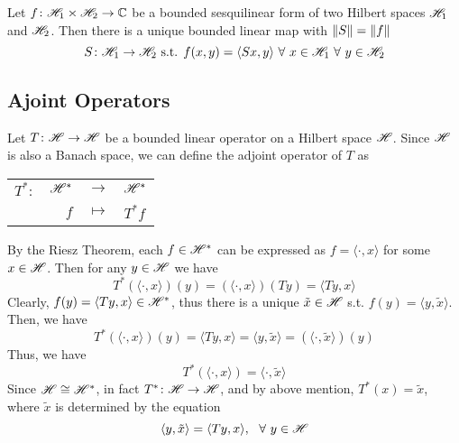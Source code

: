 \documentclass[a4paper,11pt]{report}
\begin{document}
\begin{thm}
	Let $f \colon \mathscr{H}_1 \times \mathscr{H}_2 \rightarrow \mathbb{C}$ be a bounded sesquilinear form of two Hilbert spaces $\mathscr{H}_1$ and $\mathscr{H}_2$. Then there is a unique bounded linear map with $\left\lVert S\right\lVert = \left\lVert f\right\lVert$
	\begin{equation*}
		S \colon \mathscr{H}_1 \rightarrow \mathscr{H}_2 \text{ s.t. } f(x,y)= \langle Sx,y \rangle ~\forall~ x \in \mathscr{H}_1 ~\forall~ y \in \mathscr{H}_2
	\end{equation*}
\end{thm}

\subsection{Ajoint Operators}

Let $T \colon \mathscr{H} \rightarrow \mathscr{H}$ be a bounded linear operator on a Hilbert space $\mathscr{H}$. Since $\mathscr{H}$ is also a Banach space, we can define the adjoint operator of $T$ as 
\begin{center}
	\begin{tabular}{l r c l}
		$T^{*} \colon$ & $\mathscr{H}^{*}$ & $\longrightarrow$ & $\mathscr{H}^{*}$ \\			~ & $f$ & $\longmapsto$ & $T^{*}f$
	\end{tabular}
\end{center}
By the Riesz Theorem, each $f \in \mathscr{H}^{*}$ can be expressed as $f = \langle \cdot, x \rangle$ for some $x \in \mathscr{H}$. Then for any $y \in \mathscr{H}$ we have
\begin{equation*}
	T^{*}(\langle \cdot, x \rangle)(y) = (\langle \cdot, x \rangle)(Ty) =\langle Ty, x \rangle 
\end{equation*}
Clearly, $f(y) = \langle Ty, x \rangle  \in \mathscr{H}^{*}$, thus there is a unique $\tilde{x} \in \mathscr{H}$ s.t. $f(y) = \langle y, \tilde{x} \rangle$. Then, we have 
\begin{equation*}
	T^{*}(\langle \cdot, x \rangle)(y) = \langle Ty, x \rangle = \langle y, \tilde{x} \rangle = (\langle \cdot, \tilde{x} \rangle)(y)
\end{equation*}
Thus, we have 
\begin{equation*}
	T^{*}(\langle \cdot, x \rangle) = \langle \cdot, \tilde{x} \rangle
\end{equation*}
Since $\mathscr{H} \cong \mathscr{H}^{*}$, in fact $T^{*} \colon \mathscr{H} \rightarrow \mathscr{H}$, and by above mention, $T^{*}(x) = \tilde{x}$, where $\tilde{x}$ is determined by the equation
\begin{equation*}
	\langle y, \tilde{x} \rangle = \langle Ty, x \rangle,~~ \forall~ y \in \mathscr{H}
\end{equation*}
\end{document}
